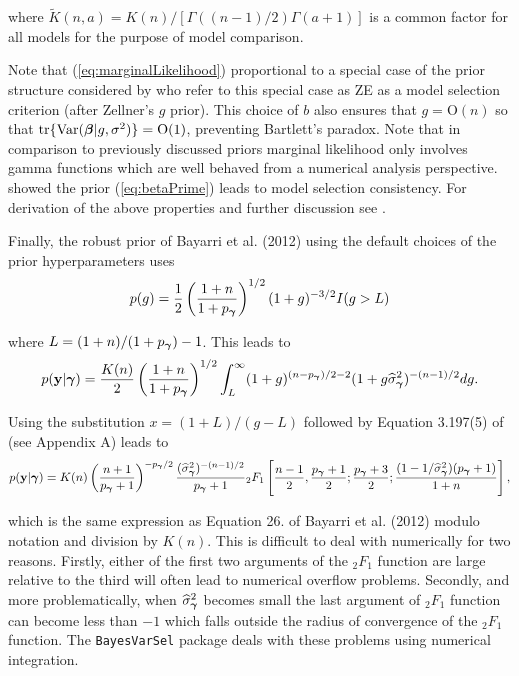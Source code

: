 \documentclass{article}[12pt]
\def\BigO{\mbox{O}}
\begin{document}
\noindent where
$\widetilde{K}(n,a) = 
K(n)/[\Gamma( (n-1)/2 )\Gamma(a + 1)]$
is a common factor for all models for the purpose of model comparison.

Note that (\ref{eq:marginalLikelihood}) proportional
to a special case of the prior structure considered by \cite{Maruyama2011}
who refer to this special case as ZE as a model selection criterion (after Zellner's $g$ prior). This choice of $b$ also ensures that $g = \BigO(n)$ so that $\tr\{\Var(\vbeta | g, \sigma^2)\} = \BigO(1)$, preventing Bartlett's paradox. 
Note that in comparison to previously discussed priors
marginal likelihood only involves gamma functions which
are well behaved from a numerical analysis perspective. 
\cite{Maruyama2011} showed the prior (\ref{eq:betaPrime}) leads to model
selection consistency.
For derivation of the above properties and further discussion see \cite{Maruyama2011}. 

Finally, the robust prior of Bayarri et al. (2012) using the default
choices of the prior hyperparameters uses 
$$
p(g) = \frac{1}{2}\left(\frac{1+n}{1 + p_{\boldsymbol \gamma}}  \right)^{1/2} (1 + g)^{-3/2}I(g > L)
$$
 
\noindent where $L = (1 + n)/(1 + p_{\boldsymbol \gamma}) - 1$. This leads to 
\begin{equation}\label{eq:yGivenG}
\displaystyle p({\bf y}|{\boldsymbol \gamma})
\displaystyle = \frac{K(n)}{2}\left(\frac{1+n}{1 + p_{\boldsymbol \gamma}}  \right)^{1/2} 
\int_L^\infty  (1 + g)^{(n - p_{\boldsymbol \gamma})/2 - 2}(  1 + g \widehat{\sigma}_{\boldsymbol \gamma}^2)^{-(n-1)/2} dg.
\end{equation}

\noindent Using the substitution 
$x = (1 + L)/(g - L)$ followed by Equation 3.197(5) of \cite{Gradshteyn2007}
(see Appendix A) leads to
\begin{equation}\label{eq:yGivenGammaRobust}
\displaystyle p({\bf y}|{\boldsymbol \gamma})
 \displaystyle = K(n) \left( \frac{n + 1}{ p_{\boldsymbol \gamma} + 1} \right)^{ - p_{\boldsymbol \gamma}/2} \frac{(\widehat{\sigma}_{\boldsymbol \gamma}^2)^{-(n-1)/2}}{p_{\boldsymbol \gamma}+1}
{}_2F_1\left[ \frac{n-1}{2}, \frac{p_{\boldsymbol \gamma}+1}{2}; \frac{p_{\boldsymbol \gamma}+3}{2}  ; 
\frac{(1  - 1/\widehat{\sigma}_{\boldsymbol \gamma}^2)(p_{\boldsymbol \gamma} + 1)}{1 + n} \right],
\end{equation}

\noindent which is the same expression as Equation 26. of Bayarri et al. (2012) modulo notation
and division by $K(n)$.
This is difficult to deal with numerically for two reasons. Firstly, either of the first 
two arguments of the ${}_2F_1$ function are large relative to the third will often lead to numerical overflow problems. Secondly,
and more problematically, when $\widehat{\sigma}_{\boldsymbol \gamma}^2$ becomes small the last argument
of ${}_2F_1$ function can become less than $-1$ which falls outside the radius of convergence
of the ${}_2F_1$ function. The {\tt BayesVarSel} package deals with these problems using numerical
integration.
 
\end{document}
